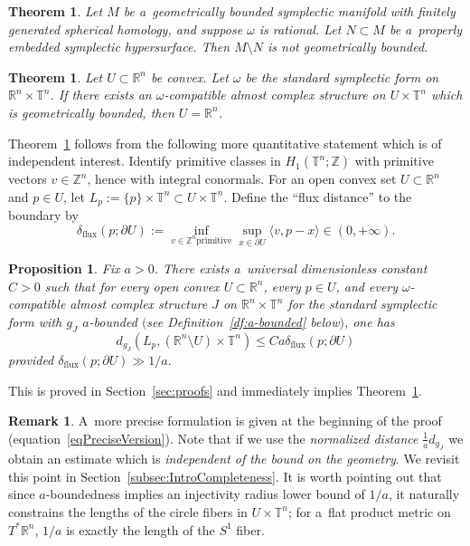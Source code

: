 \documentclass[pdftex]{sigma}
\numberwithin{equation}{section}
\newcommand{\bR}{{\mathbb R}}
\newcommand{\bZ}{{\mathbb Z}}
\newcommand{\bT}{{\mathbb T}}
\newtheorem{tm}[Theorem]{Theorem}
\newtheorem{Proposition}[Theorem]{Proposition}
\theoremstyle{definition}
\newtheorem{rem}[Theorem]{Remark}
\begin{document}
\begin{tm}\label{tm:1}
Let $M$ be a~geometrically bounded symplectic manifold with finitely generated spherical homology, and suppose $\omega$ is rational.
Let $N\subset M$ be a~properly embedded symplectic hypersurface.
Then $M\setminus N$ is not geometrically bounded.
\end{tm}

\begin{tm}\label{tm:2}
Let $U\subset \bR^n$ be convex.
Let $\omega$ be the standard symplectic form on $\bR^n\times\bT^n$. If there exists an $\omega$-compatible almost complex structure on $U\times\bT^n$ which is geometrically bounded, then $U=\bR^n$.
\end{tm}

Theorem~\ref{tm:2} follows from the following more quantitative statement which is of independent interest.
Identify primitive classes in $H_1(\bT^n;\bZ)$ with primitive vectors $v\in\bZ^n$, hence with integral conormals.
For an open convex set $U\subset\bR^n$ and $p\in U$, let $L_p := \{p\}\times \bT^n \subset U\times\bT^n$. Define the ``flux distance'' to the boundary by
\[
\delta_{\mathrm{flux}}(p;\partial U):=\inf_{v\in\bZ^n \mathrm{primitive}}\sup_{x\in \partial U}\langle v,p-x\rangle\in(0,+\infty).
\]
\begin{Proposition}\label{prop:flux-distance}
Fix $a>0$. There exists a~universal dimensionless constant $C>0$ such that for every open convex $U\subset\bR^n$, every $p\in U$, and every $\omega$-compatible almost complex structure $J$ on $\bR^n\times\bT^n$ for the standard symplectic form with $g_J$ $a$-bounded $($see Definition~{\rm\ref{df:a-bounded}} below$)$, one has
\[
 d_{g_J}(L_p, (\bR^n\setminus U)\times\bT^n)\leq Ca\delta_{\mathrm{flux}}(p;\partial U)
\]
provided $\delta_{\mathrm{flux}}(p;\partial U)\gg 1/a$.
\end{Proposition}
This is proved in Section~\ref{sec:proofs} and immediately implies Theorem~\ref{tm:2}.
\begin{rem}\label{rem:Normalized} A~more precise formulation is given at the beginning of the proof (equation~\eqref{eqPreciseVersion}). Note that if we use the \emph{normalized distance} $\frac1{a}d_{g_J}$ we obtain an estimate which is \emph{independent of the bound on the geometry}. We revisit this point in Section~\ref{subsec:IntroCompleteness}. It is worth pointing out that since $a$-boundedness implies an injectivity radius lower bound of $1/a$, it naturally constrains the lengths of the circle fibers in $U\times\bT^n$; for a~flat product metric on $T^*\bR^n$, $1/a$ is exactly the length of the $S^1$ fiber.
\end{rem}
\end{document}
